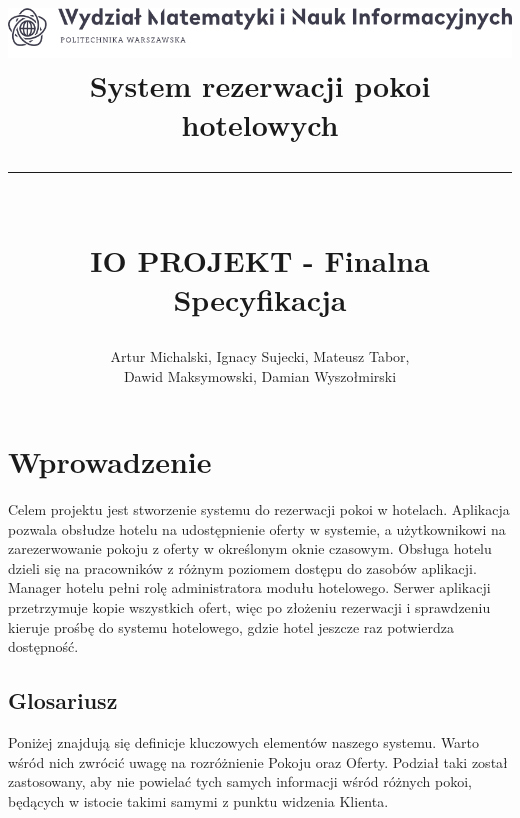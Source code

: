 \documentclass{article}
\begin{document}
\title{\includegraphics[width=\textwidth]{MINI logo long.png}\\
        System rezerwacji pokoi hotelowych
        \noindent\rule{\textwidth}{1pt}\\
        IO PROJEKT - Finalna Specyfikacja}
\author{Artur Michalski, Ignacy Sujecki, Mateusz Tabor,\\Dawid Maksymowski, Damian Wyszołmirski}
\maketitle

\tableofcontents
{}
\newpage
\section{Wprowadzenie}

Celem projektu jest stworzenie systemu do rezerwacji pokoi w hotelach. Aplikacja pozwala obsłudze hotelu na udostępnienie oferty w systemie, a użytkownikowi na zarezerwowanie pokoju z oferty w określonym oknie czasowym. Obsługa hotelu dzieli się na pracowników z różnym poziomem dostępu do zasobów aplikacji. Manager hotelu pełni rolę administratora modułu hotelowego. Serwer aplikacji przetrzymuje kopie wszystkich ofert, więc po złożeniu rezerwacji i sprawdzeniu kieruje prośbę do systemu hotelowego, gdzie hotel jeszcze raz potwierdza dostępność.
\subsection{Glosariusz}
Poniżej znajdują się definicje kluczowych elementów naszego systemu. Warto wśród nich zwrócić uwagę na rozróżnienie Pokoju oraz Oferty. Podział taki został zastosowany, aby nie powielać tych samych informacji wśród różnych pokoi, będących w istocie takimi samymi z punktu widzenia Klienta.
\end{document}
